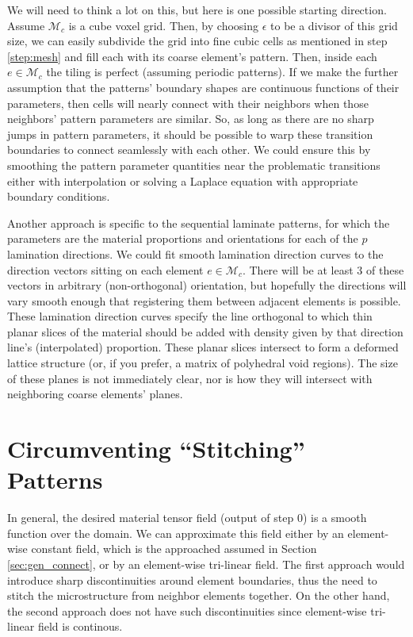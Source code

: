 \documentclass[10pt]{article}
\providecommand{\mesh}{\mathcal{M}}
\begin{document}
We will need to think a lot on this, but here is one possible starting
direction. Assume $\mesh_c$ is a cube voxel grid. Then, by choosing $\epsilon$
to be a divisor of this grid size, we can easily subdivide the grid into fine
cubic cells as mentioned in step \ref{step:mesh} and fill each with its coarse
element's pattern. Then, inside each $e \in \mesh_c$ the tiling is perfect
(assuming periodic patterns). If we make the further assumption that the
patterns' boundary shapes are continuous functions of their parameters, then
cells will nearly connect with their neighbors when those neighbors' pattern
parameters are similar. So, as long as there are no sharp jumps in pattern
parameters, it should be possible to warp these transition boundaries to connect
seamlessly with each other. We could ensure this by smoothing the pattern
parameter quantities near the problematic transitions either with interpolation
or solving a Laplace equation with appropriate boundary conditions.

Another approach is specific to the sequential laminate patterns, for which the
parameters are the material proportions and orientations for each of the $p$
lamination directions. We could fit smooth lamination direction curves to the
direction vectors sitting on each element $e \in \mesh_c$. There will be at
least $3$ of these vectors in arbitrary (non-orthogonal) orientation, but
hopefully the directions will vary smooth enough that registering them between
adjacent elements is possible. These lamination direction curves specify the
line orthogonal to which thin planar slices of the material should be added with
density given by that direction line's (interpolated) proportion. These planar
slices intersect to form a deformed lattice structure (or, if you prefer, a
matrix of polyhedral void regions). The size of these planes is not immediately
clear, nor is how they will intersect with neighboring coarse elements' planes.

\section{Circumventing ``Stitching'' Patterns}
\label{sec:procedual_pattern}
In general, the desired material tensor field (output of step 0) is a smooth
function over the domain.  We can approximate this field either by an
element-wise constant field, which is the approached assumed in Section
\ref{sec:gen_connect}, or by an element-wise tri-linear field.  The first
approach would introduce sharp discontinuities around element boundaries, thus
the need to stitch the microstructure from neighbor elements together.
On the other hand, the second approach does not have such discontinuities since
element-wise tri-linear field is continous.
\end{document}
